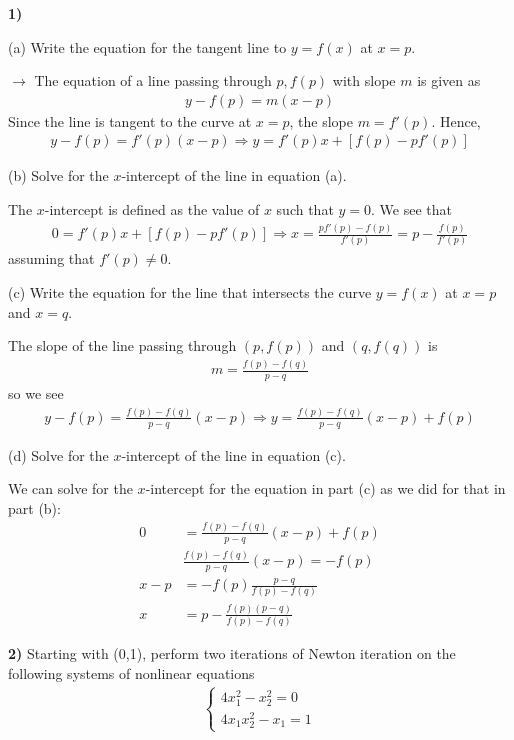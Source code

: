 \documentclass[12pt,a4paper]{article}
\newcommand{\prob}[2]{\textbf{#1)} #2}
\begin{document}
\prob{1}{}

(a) Write the equation for the tangent line to $y = f(x)$ at $x = p$.

$\rightarrow$ The equation of a line passing through $p,f(p)$ with slope $m$ is given as
\begin{align*}
y-f(p) = m(x-p)
\end{align*}
Since the line is tangent to the curve at $x = p$, the slope $m = f'(p)$. Hence,
\begin{align*}
y - f(p) = f'(p)(x-p) \Rightarrow y = f'(p)x + [f(p) - pf'(p)]
\end{align*}

(b) Solve for the $x$-intercept of the line in equation (a).

The $x$-intercept is defined as the value of $x$ such that $y = 0$. We see that
\begin{align*}
0 = f'(p)x + [f(p) - pf'(p)] \Rightarrow x = \frac{pf'(p)-f(p)}{f'(p)} = p - \frac{f(p)}{f'(p)}
\end{align*}
assuming that $f'(p) \not= 0$.

(c) Write the equation for the line that intersects the curve $y = f(x)$ at $x = p$ and $x = q$.

The slope of the line passing through $(p,f(p))$ and $(q,f(q))$ is 
\begin{align*}
m = \frac{f(p)-f(q)}{p-q}
\end{align*}
so we see
\begin{align*}
y - f(p) = \frac{f(p)-f(q)}{p-q}(x-p) \Rightarrow y = \frac{f(p)-f(q)}{p-q}(x-p) + f(p)
\end{align*}

(d) Solve for the $x$-intercept of the line in equation (c).

We can solve for the $x$-intercept for the equation in part (c) as we did for that in part (b):
\begin{align*}
0 &= \frac{f(p)-f(q)}{p-q}(x-p) + f(p) \\
&\frac{f(p)-f(q)}{p-q}(x-p) = -f(p) \\
x-p &= -f(p)\frac{p-q}{f(p)-f(q)} \\
x &= p - \frac{f(p)(p-q)}{f(p)-f(q)}
\end{align*}

\prob{2}{Starting with (0,1), perform two iterations of Newton iteration on the following systems of nonlinear equations
\begin{align*}
\begin{cases}
4x_1^2 - x_2^2 = 0 \\
4x_1x_2^2 - x_1 = 1
\end{cases}
\end{align*}
}
\end{document}
